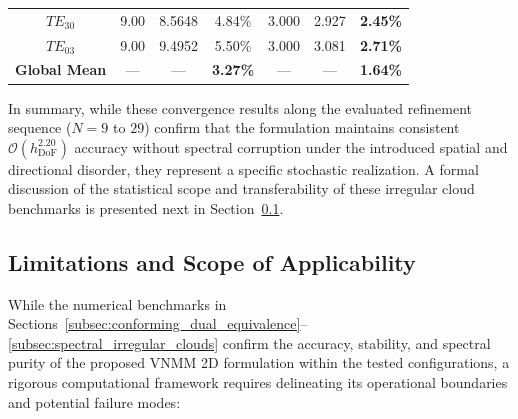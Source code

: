 \documentclass[preprint,12pt]{elsarticle}
\begin{document}
\begin{table}[!htbp]
{\begin{tabular}{@{} c c c c c c c @{}}
            $TE_{30}$                 & 9.00                            & 8.5648                    & 4.84\%                        & 3.000                        & 2.927                  & \textbf{2.45\%}           \\
            $TE_{03}$                 & 9.00                            & 9.4952                    & 5.50\%                        & 3.000                        & 3.081                  & \textbf{2.71\%}           \\
            \midrule
            \textbf{Global Mean}      & ---                             & ---                       & \textbf{3.27\%}               & ---                          & ---                    & \textbf{1.64\%}           \\
            \bottomrule
        \end{tabular}%
    }
\end{table}

In summary, while these convergence results along the evaluated refinement sequence ($N = 9$ to $29$) confirm that the formulation maintains consistent $\mathcal{O}(h_{\mathrm{DoF}}^{2.20})$ accuracy without spectral corruption under the introduced spatial and directional disorder, they represent a specific stochastic realization. A formal discussion of the statistical scope and transferability of these irregular cloud benchmarks is presented next in Section~\ref{subsec:limitations_scope}.

\subsection{Limitations and Scope of Applicability}
\label{subsec:limitations_scope}

While the numerical benchmarks in Sections~\ref{subsec:conforming_dual_equivalence}--\ref{subsec:spectral_irregular_clouds} confirm the accuracy, stability, and spectral purity of the proposed VNMM 2D formulation within the tested configurations, a rigorous computational framework requires delineating its operational boundaries and potential failure modes:
\end{document}
